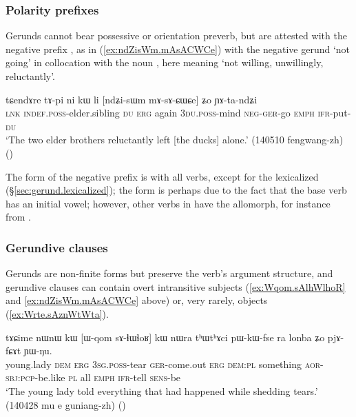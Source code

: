 \subsubsection{Polarity prefixes} \label{sec:gerund.neg}
Gerunds cannot bear possessive or orientation preverb, but are attested with the negative prefix , as in (\ref{ex:ndZisWm.mAsACWCe}) with the negative gerund  `not going' in collocation with the noun , here meaning `not willing, unwillingly, reluctantly'.

\begin{exe}
\ex \label{ex:ndZisWm.mAsACWCe}
\gll tɕendɤre tɤ-pi ni kɯ li [ndʑi-sɯm mɤ-sɤ-ɕɯ\redp{}ɕe] ʑo ɲɤ-ta-ndʑi \\
\textsc{lnk} \textsc{indef}.\textsc{poss}-elder.sibling \textsc{du} \textsc{erg} again \textsc{3du}.\textsc{poss}-mind \textsc{neg}-\textsc{ger}-go \textsc{emph} \textsc{ifr}-put-\textsc{du} \\
\glt `The two elder brothers reluctantly left [the ducks] alone.' (140510 fengwang-zh)
()
\end{exe}

The form of the negative prefix is  with all verbs, except for the lexicalized  (§\ref{sec:gerund.lexicalized}); the form  is perhaps due to the fact that the base verb  has an initial  vowel; however, other verbs in  have the  allomorph, for instance  from .

 
\subsubsection{Gerundive clauses}  \label{sec:gerund.clauses}
Gerunds are non-finite forms but preserve the verb's argument structure, and gerundive clauses can contain overt intransitive subjects (\ref{ex:Wqom.sAlhWlhoR} and \ref{ex:ndZisWm.mAsACWCe} above) or, very rarely, objects (\ref{ex:Wrte.sAznWtWta}).

\begin{exe}
\ex \label{ex:Wqom.sAlhWlhoR}
\gll tɤɕime nɯnɯ kɯ [ɯ-qom sɤ-ɬɯ\redp{}ɬoʁ] kɯ nɯra tʰɯtʰɤci pɯ-kɯ-fse ra lonba ʑo pjɤ-fɕɤt ɲɯ-ŋu. \\
young.lady \textsc{dem} \textsc{erg} \textsc{3sg}.\textsc{poss}-tear \textsc{ger}-come.out \textsc{erg} \textsc{dem}:\textsc{pl} something \textsc{aor}-\textsc{sbj}:\textsc{pcp}-be.like \textsc{pl} all \textsc{emph} \textsc{ifr}-tell \textsc{sens}-be \\
\glt `The young lady told everything that had happened while shedding tears.' (140428 mu e guniang-zh)
()
\end{exe}

